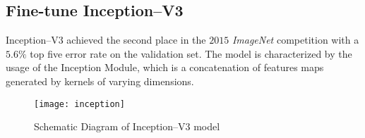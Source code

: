 \subsection{Fine-tune Inception--V3}
\label{subsec:inception}
Inception--V3 achieved the second place in the $2015$ \emph{ImageNet} 
competition with a $5.6 \%$ top five error rate on the validation set. 
The model is characterized by the usage of the Inception Module, which is a 
concatenation of features maps generated by kernels of varying dimensions.
%
\begin{figure}[htb]
\centering
\texttt{[image: inception]}
\caption{Schematic Diagram of Inception--V3 model}
\label{fig:inceptionV3schema}
\end{figure}
%
